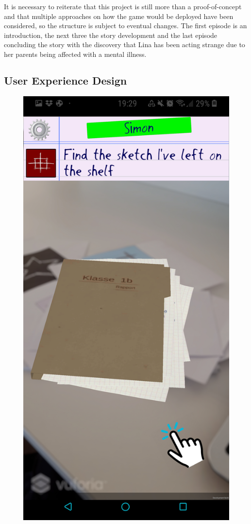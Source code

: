 \par It is necessary to reiterate that this project is still more than a proof-of-concept and that multiple approaches on how the game would be deployed have been considered, so the structure is subject to eventual changes. 
The first episode is an introduction, the next three the story development and the last episode concluding the story with the discovery that Lina has been acting strange due to her parents being affected with a mental illness.

\subsection{User Experience Design}

\begin{figure}
    \centering
    \includegraphics[scale = 0.07]{Screenshot_20190518-192941_LINA.jpg}

\end{figure}
